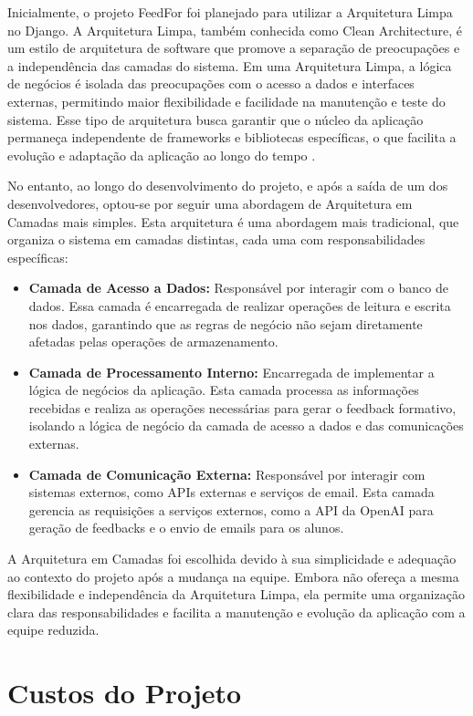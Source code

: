 Inicialmente, o projeto FeedFor foi planejado para utilizar a Arquitetura Limpa no Django. A Arquitetura Limpa, também conhecida como Clean Architecture, é um estilo de arquitetura de software que promove a separação de preocupações e a independência das camadas do sistema. Em uma Arquitetura Limpa, a lógica de negócios é isolada das preocupações com o acesso a dados e interfaces externas, permitindo maior flexibilidade e facilidade na manutenção e teste do sistema. Esse tipo de arquitetura busca garantir que o núcleo da aplicação permaneça independente de frameworks e bibliotecas específicas, o que facilita a evolução e adaptação da aplicação ao longo do tempo \cite{tabnews2023}.

No entanto, ao longo do desenvolvimento do projeto, e após a saída de um dos desenvolvedores, optou-se por seguir uma abordagem de Arquitetura em Camadas mais simples. Esta arquitetura é uma abordagem mais tradicional, que organiza o sistema em camadas distintas, cada uma com responsabilidades específicas:

\begin{itemize}
    \item \textbf{Camada de Acesso a Dados:} Responsável por interagir com o banco de dados. Essa camada é encarregada de realizar operações de leitura e escrita nos dados, garantindo que as regras de negócio não sejam diretamente afetadas pelas operações de armazenamento.
    \item \textbf{Camada de Processamento Interno:} Encarregada de implementar a lógica de negócios da aplicação. Esta camada processa as informações recebidas e realiza as operações necessárias para gerar o feedback formativo, isolando a lógica de negócio da camada de acesso a dados e das comunicações externas.
    \item \textbf{Camada de Comunicação Externa:} Responsável por interagir com sistemas externos, como APIs externas e serviços de email. Esta camada gerencia as requisições a serviços externos, como a API da OpenAI para geração de feedbacks e o envio de emails para os alunos.
\end{itemize}

A Arquitetura em Camadas foi escolhida devido à sua simplicidade e adequação ao contexto do projeto após a mudança na equipe. Embora não ofereça a mesma flexibilidade e independência da Arquitetura Limpa, ela permite uma organização clara das responsabilidades e facilita a manutenção e evolução da aplicação com a equipe reduzida.

\section{Custos do Projeto}

